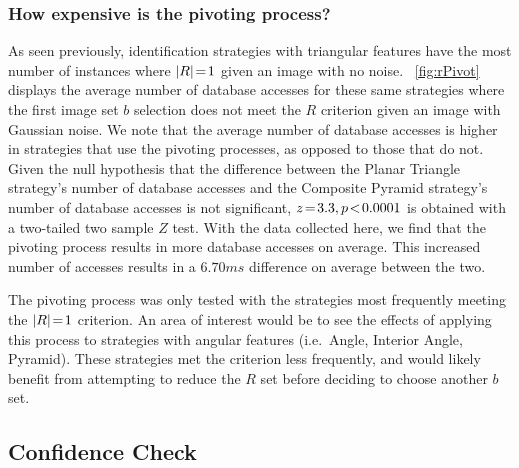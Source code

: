 \subsubsection{How expensive is the pivoting process?}
As seen previously, identification strategies with triangular features have the most number of instances where $\left| R \right| \!=\! 1$ given an image with no noise.
~\autoref{fig:rPivot} displays the average number of database accesses for these same strategies where the first image set $b$ selection does not meet the $R$ criterion given an image with Gaussian noise.
We note that the average number of database accesses is higher in strategies that use the pivoting processes, as opposed to those that do not.
Given the null hypothesis that the difference between the Planar Triangle strategy's number of database accesses and the Composite Pyramid strategy's number of database accesses is not significant, $z \!=\! 3.3, p\!<\!0.0001$ is obtained with a two-tailed two sample $Z$ test.
With the data collected here, we find that the pivoting process results in more database accesses on average.
This increased number of accesses results in a $6.70\si{ms}$ difference on average between the two.

The pivoting process was only tested with the strategies most frequently meeting the $\left| R \right|\!=\!1 $ criterion.
An area of interest would be to see the effects of applying this process to strategies with angular features (i.e.\ Angle, Interior Angle, Pyramid).
These strategies met the criterion less frequently, and would likely benefit from attempting to reduce the $R$ set before deciding to choose another $b$ set.

\subsection{Confidence Check}\label{subsec:identificationStep}
